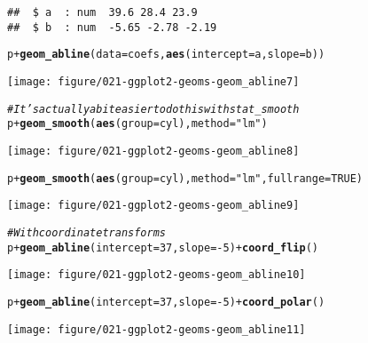 \documentclass[a4paper,titlepage]{tufte-handout}\usepackage[]{graphicx}\usepackage[]{color}
\makeatletter
\def\maxwidth{ %
  \ifdim\Gin@nat@width>\linewidth
    \linewidth
  \else
    \Gin@nat@width
  \fi
}
\newcommand{\hlnum}[1]{\textcolor[rgb]{0.686,0.059,0.569}{#1}}%
\newcommand{\hlstr}[1]{\textcolor[rgb]{0.192,0.494,0.8}{#1}}%
\newcommand{\hlcom}[1]{\textcolor[rgb]{0.678,0.584,0.686}{\textit{#1}}}%
\newcommand{\hlopt}[1]{\textcolor[rgb]{0,0,0}{#1}}%
\newcommand{\hlstd}[1]{\textcolor[rgb]{0.345,0.345,0.345}{#1}}%
\newcommand{\hlkwc}[1]{\textcolor[rgb]{0.333,0.667,0.333}{#1}}%
\newcommand{\hlkwd}[1]{\textcolor[rgb]{0.737,0.353,0.396}{\textbf{#1}}}%
\newenvironment{kframe}{%
 \def\at@end@of@kframe{}%
 \ifinner\ifhmode%
  \def\at@end@of@kframe{\end{minipage}}%
  \begin{minipage}{\columnwidth}%
 \fi\fi%
 \def\FrameCommand##1{\hskip\@totalleftmargin \hskip-\fboxsep
 \colorbox{shadecolor}{##1}\hskip-\fboxsep
     \hskip-\linewidth \hskip-\@totalleftmargin \hskip\columnwidth}%
 \MakeFramed {\advance\hsize-\width
   \@totalleftmargin\z@ \linewidth\hsize
   \@setminipage}}%
 {\par\unskip\endMakeFramed%
 \at@end@of@kframe}
\newenvironment{knitrout}{}{} %
\makeatother
\begin{document}
\begin{knitrout}
\begin{kframe}
\begin{verbatim}
##  $ a  : num  39.6 28.4 23.9
##  $ b  : num  -5.65 -2.78 -2.19
\end{verbatim}
\begin{alltt}
\hlstd{p} \hlopt{+} \hlkwd{geom_abline}\hlstd{(}\hlkwc{data}\hlstd{=coefs,} \hlkwd{aes}\hlstd{(}\hlkwc{intercept}\hlstd{=a,} \hlkwc{slope}\hlstd{=b))}
\end{alltt}
\end{kframe}
\texttt{[image: figure/021-ggplot2-geoms-geom\_abline7]} 
\begin{kframe}\begin{alltt}
\hlcom{# It's actually a bit easier to do this with stat_smooth}
\hlstd{p} \hlopt{+} \hlkwd{geom_smooth}\hlstd{(}\hlkwd{aes}\hlstd{(}\hlkwc{group}\hlstd{=cyl),} \hlkwc{method}\hlstd{=}\hlstr{"lm"}\hlstd{)}
\end{alltt}
\end{kframe}
\texttt{[image: figure/021-ggplot2-geoms-geom\_abline8]} 
\begin{kframe}\begin{alltt}
\hlstd{p} \hlopt{+} \hlkwd{geom_smooth}\hlstd{(}\hlkwd{aes}\hlstd{(}\hlkwc{group}\hlstd{=cyl),} \hlkwc{method}\hlstd{=}\hlstr{"lm"}\hlstd{,} \hlkwc{fullrange}\hlstd{=}\hlnum{TRUE}\hlstd{)}
\end{alltt}
\end{kframe}
\texttt{[image: figure/021-ggplot2-geoms-geom\_abline9]} 
\begin{kframe}\begin{alltt}
\hlcom{# With coordinate transforms}
\hlstd{p} \hlopt{+} \hlkwd{geom_abline}\hlstd{(}\hlkwc{intercept} \hlstd{=} \hlnum{37}\hlstd{,} \hlkwc{slope} \hlstd{=} \hlopt{-}\hlnum{5}\hlstd{)} \hlopt{+} \hlkwd{coord_flip}\hlstd{()}
\end{alltt}
\end{kframe}
\texttt{[image: figure/021-ggplot2-geoms-geom\_abline10]} 
\begin{kframe}\begin{alltt}
\hlstd{p} \hlopt{+} \hlkwd{geom_abline}\hlstd{(}\hlkwc{intercept} \hlstd{=} \hlnum{37}\hlstd{,} \hlkwc{slope} \hlstd{=} \hlopt{-}\hlnum{5}\hlstd{)} \hlopt{+} \hlkwd{coord_polar}\hlstd{()}
\end{alltt}
\end{kframe}
\texttt{[image: figure/021-ggplot2-geoms-geom\_abline11]} 
\begin{kframe}\begin{alltt}


\end{alltt}
\end{kframe}
\end{knitrout}
\end{document}
